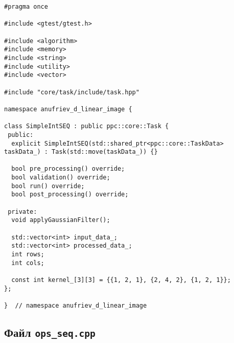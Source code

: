 \documentclass[12pt]{article}
\begin{document}
\begin{lstlisting}
#pragma once

#include <gtest/gtest.h>

#include <algorithm>
#include <memory>
#include <string>
#include <utility>
#include <vector>

#include "core/task/include/task.hpp"

namespace anufriev_d_linear_image {

class SimpleIntSEQ : public ppc::core::Task {
 public:
  explicit SimpleIntSEQ(std::shared_ptr<ppc::core::TaskData> taskData_) : Task(std::move(taskData_)) {}

  bool pre_processing() override;
  bool validation() override;
  bool run() override;
  bool post_processing() override;

 private:
  void applyGaussianFilter();

  std::vector<int> input_data_;
  std::vector<int> processed_data_;
  int rows;
  int cols;

  const int kernel_[3][3] = {{1, 2, 1}, {2, 4, 2}, {1, 2, 1}};
};

}  // namespace anufriev_d_linear_image
\end{lstlisting}

\subsection*{Файл \texttt{ops\_seq.cpp}}
\end{document}
